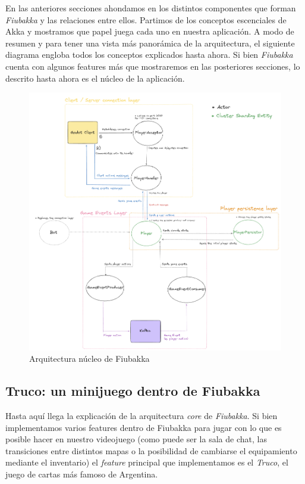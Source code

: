 \noindent En las anteriores secciones ahondamos en los distintos componentes que forman \textit{Fiubakka} y las relaciones entre ellos. Partimos de los conceptos escenciales
de Akka y mostramos que papel juega cada uno en nuestra aplicación. A modo de resumen y para tener una vista más panorámica de la arquitectura, el siguiente diagrama engloba
todos los conceptos explicados hasta ahora. Si bien \textit{Fiubakka} cuenta con algunos features más que mostraremos en las posteriores secciones, lo descrito hasta ahora es el
núcleo de la aplicación.

\begin{figure}[htbp]
    \centering
    \includegraphics[width=1\textwidth]{../assets/fiubakka-architecture.png}
    \caption{Arquitectura núcleo de Fiubakka}
\end{figure}

\newpage

\subsection{Truco: un minijuego dentro de Fiubakka}

\noindent Hasta aquí llega la explicación de la arquitectura \textit{core} de \textit{Fiubakka}. Si bien implementamos varios features dentro de Fiubakka para jugar con lo que es posible hacer
en nuestro videojuego (como puede ser la sala de chat, las transiciones entre distintos mapas o la posibilidad de cambiarse el equipamiento mediante el inventario) el \textit{feature} principal
que implementamos es el \textit{Truco}, el juego de cartas más famoso de Argentina.

